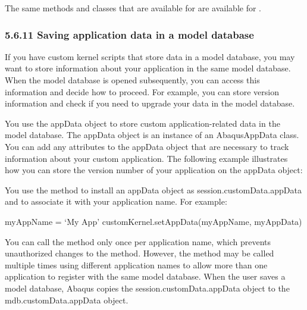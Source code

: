 \documentclass[letterpaper,10pt,english]{sphinxmanual}
\begin{document}
The same methods and classes that are available for  are available for .


\subsubsection{5.6.11 Saving application data in a model database}
\label{\detokenize{abq_script_guide:saving-application-data-in-a-model-database}}
If you have custom kernel scripts that store data in a model database, you may want to store information about your application in the same model database. When the model database is opened subsequently, you can access this information and decide how to proceed. For example, you can store version information and check if you need to upgrade your data in the model database.

You use the appData object to store custom application-related data in the model database. The appData object is an instance of an AbaqusAppData class. You can add any attributes to the appData object that are necessary to track information about your custom application. The following example illustrates how you can store the version number of your application on the appData object:

\begin{sphinxVerbatim}[commandchars=\\\{\},numbers=left,firstnumber=1,stepnumber=1]
 
  
  
  
  
\end{sphinxVerbatim}

You use the  method to install an appData object as session.customData.appData and to associate it with your application name. For example:

\begin{sphinxVerbatim}[commandchars=\\\{\},numbers=left,firstnumber=1,stepnumber=1]
myAppName = ‘My App’
customKernel.setAppData(myAppName, myAppData)
\end{sphinxVerbatim}

You can call the  method only once per application name, which prevents unauthorized changes to the method. However, the  method may be called multiple times using different application names to allow more than one application to register with the same model database.
When the user saves a model database, Abaqus copies the session.customData.appData object to the mdb.customData.appData object.
\end{document}
